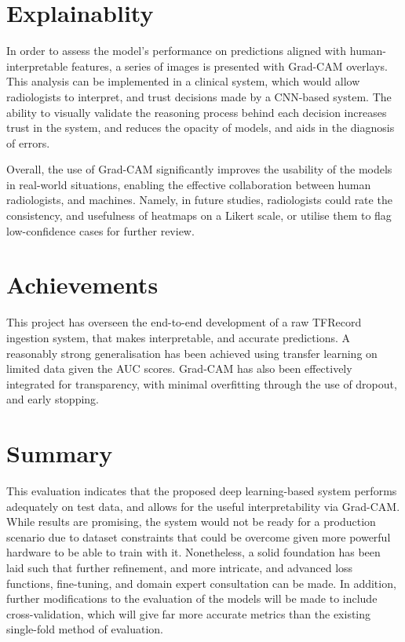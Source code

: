 \documentclass[../main]{subfiles}
\begin{document}
\section{Explainablity}
\label{sec:explainability}
In order to assess the model's performance on predictions aligned with human-interpretable features, a series of images is presented with Grad-CAM overlays. This analysis can be implemented in a clinical system, which would allow radiologists to interpret, and trust decisions made by a CNN-based system. The ability to visually validate the reasoning process behind each decision increases trust in the system, and reduces the opacity of models, and aids in the diagnosis of errors.

Overall, the use of Grad-CAM significantly improves the usability of the models in real-world situations, enabling the effective collaboration between human radiologists, and machines. Namely, in future studies, radiologists could rate the consistency, and usefulness of heatmaps on a Likert scale, or utilise them to flag low-confidence cases for further review.

\section{Achievements}
This project has overseen the end-to-end development of a raw TFRecord ingestion system, that makes interpretable, and accurate predictions. A reasonably strong generalisation has been achieved using transfer learning on limited data given the AUC scores. Grad-CAM has also been effectively integrated for transparency, with minimal overfitting through the use of dropout, and early stopping.

\section{Summary}
\label{sec:summary}
This evaluation indicates that the proposed deep learning-based system performs adequately on test data, and allows for the useful interpretability via Grad-CAM. While results are promising, the system would not be ready for a production scenario due to dataset constraints that could be overcome given more powerful hardware to be able to train with it. Nonetheless, a solid foundation has been laid such that further refinement, and more intricate, and advanced loss functions, fine-tuning, and domain expert consultation can be made. In addition, further modifications to the evaluation of the models will be made to include cross-validation, which will give far more accurate metrics than the existing single-fold method of evaluation.
\end{document}
